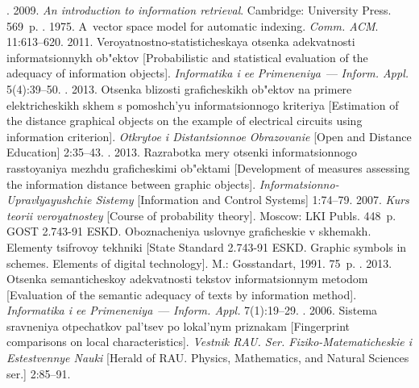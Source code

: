 



  \begin{multicols}{2}

\renewcommand{\bibname}{\protect\rmfamily References}

{\small\frenchspacing
{%
\begin{thebibliography}{99}


.
2009. \textit{An introduction to information retrieval}.
Cambridge: University Press. 569~p.
. 1975.
A~vector space model for automatic indexing.
\textit{Comm. ACM}.  11:613--620.
 2011. Veroyatnostno-statisticheskaya
otsen\-ka adekvatnosti informatsionnykh ob"ektov
[Probabilistic and statistical evaluation of the adequacy of information objects].
\textit{Informatika i ee Primeneniya}~---
\textit{Inform. Appl.} 5(4):39--50.
.
2013. Otsenka blizosti graficheskikh ob"ektov na primere elektricheskikh
skhem s pomoshch'yu informatsionnogo kriteriya
[Estimation of the distance graphical objects on the example of electrical
circuits using information criterion].
\textit{Otkrytoe i Distantsionnoe Obrazovanie} [Open and Distance Education]
2:35--43.
. 2013.
Razrabotka mery otsenki informatsionnogo rasstoyaniya mezhdu graficheskimi
ob"ektami [Development of measures assessing the information distance between
graphic objects].
\textit{Informatsionno-Upravlyayushchie Sistemy}
[Information and Control Systems] 1:74--79.
 2007. \textit{Kurs teorii veroyatnostey}
[Course of probability theory].  Moscow: LKI Publs. 448~p.
GOST 2.743-91 ESKD. Oboznacheniya uslovnye gra\-fi\-che\-skie v skhemakh.
Elementy tsifrovoy tekhniki [State Standard 2.743-91 ESKD.
Graphic symbols in schemes. Elements of digital technology].
M.: Gosstandart, 1991. 75~p.
. 2013. Otsen\-ka semanticheskoy
adekvatnosti tekstov informatsionnym metodom
[Evaluation of the semantic adequacy of texts by information method].
\textit{Informatika i ee Primeneniya}~--- \textit{Inform. Appl.} 7(1):19--29.
. 2006.
Sistema sravneniya otpechatkov pal'tsev po lokal'nym priznakam
[Fingerprint comparisons on local characteristics].
\textit{Vestnik RAU. Ser. Fiziko-Matematicheskie i Estestvennye Nauki}
[Herald of RAU. Physics, Mathematics, and Natural Sciences ser.] 2:85--91.


\end{thebibliography}}}
\end{multicols}
